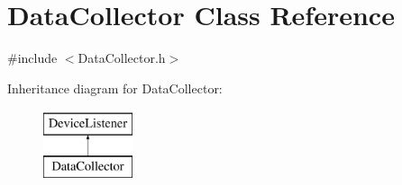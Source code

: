 \hypertarget{class_data_collector}{}\section{Data\+Collector Class Reference}
\label{class_data_collector}


{\ttfamily \#include $<$Data\+Collector.\+h$>$}

Inheritance diagram for Data\+Collector\+:\begin{figure}[H]
\begin{center}
\leavevmode
\includegraphics[height=2.000000cm]{class_data_collector}
\end{center}
\end{figure}
